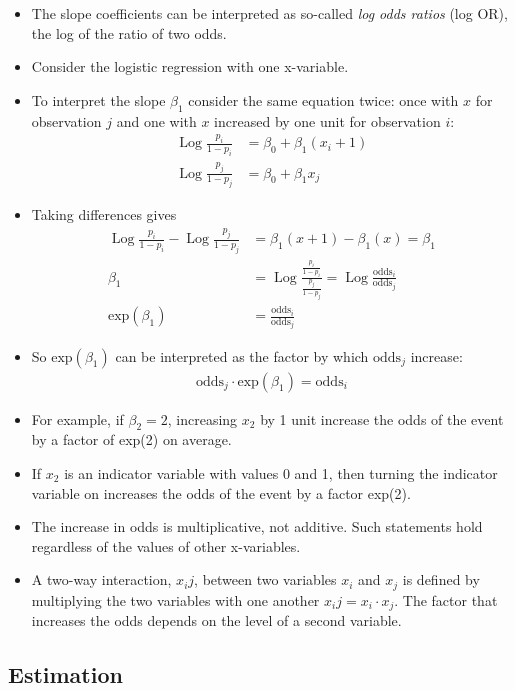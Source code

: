 \documentclass[12pt, oneside]{article}
\newcommand*{\Log}{\operatorname{Log}}
\begin{document}
\begin{itemize}
    \item The slope coefficients can be interpreted as so-called \emph{log odds ratios} (log OR), the log of the ratio of two odds.
    \item Consider the logistic regression with one x-variable. 
    \item To interpret the slope $\beta_1$ consider the same equation twice: once with $x$ for observation $j$ and one with $x$ increased by one unit for observation $i$:
    \begin{align*}
        \Log\frac{p_i}{1-p_i} &= \beta_0 + \beta_1(x_i + 1) \\
        \Log\frac{p_j}{1-p_j} &= \beta_0 + \beta_1x_j
    \end{align*}
    \item Taking differences gives
    \begin{align*}
         \Log\frac{p_i}{1-p_i} -  \Log\frac{p_j}{1-p_j} &= \beta_1(x+1) - \beta_1(x) = \beta_1 \\
         \beta_1 &= \Log\frac{\frac{p_i}{1-p_i}}{\frac{p_j}{1-p_j}} = \Log\frac{\text{odds}_i}{\text{odds}_j} \\
         \text{exp}(\beta_1) &= \frac{\text{odds}_i}{\text{odds}_j}
    \end{align*}
    \item So $\text{exp}(\beta_1)$ can be interpreted as the factor by which $\text{odds}_j$ increase:
    \begin{align*}
        {\text{odds}_j} \cdot \text{exp}(\beta_1) = \text{odds}_i
    \end{align*}
    \item For example, if $\beta_2 = 2$, increasing $x_2$ by 1 unit increase the odds of the event by a factor of exp(2) on average.
    \item If $x_2$ is an indicator variable with values 0 and 1, then turning the indicator variable on increases the odds of the event by a factor exp(2).
    \item The increase in odds is multiplicative, not additive. Such statements hold regardless of the values of other x-variables.
    \item A two-way interaction, $x_ij$, between two variables $x_i$ and $x_j$ is defined by multiplying the two variables with one another $x_ij = x_i \cdot x_j$. The factor that increases the odds depends on the level of a second variable.
\end{itemize}

\subsection{Estimation}
\end{document}
